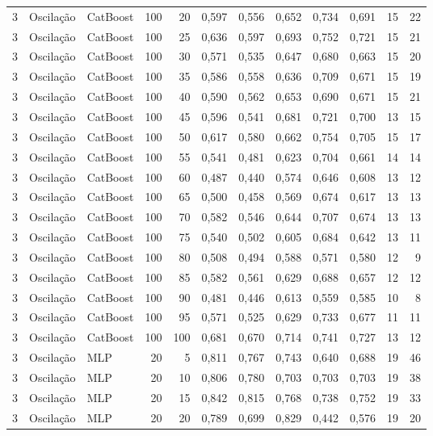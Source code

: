 \begin{longtable}{@{}rllrrrrrrrrr@{}}
3 & Oscilação & CatBoost & 100 & 20 & 0,597 & 0,556 & 0,652 & 0,734 & 0,691 & 15 & 22 \\
3 & Oscilação & CatBoost & 100 & 25 & 0,636 & 0,597 & 0,693 & 0,752 & 0,721 & 15 & 21 \\
3 & Oscilação & CatBoost & 100 & 30 & 0,571 & 0,535 & 0,647 & 0,680 & 0,663 & 15 & 20 \\
3 & Oscilação & CatBoost & 100 & 35 & 0,586 & 0,558 & 0,636 & 0,709 & 0,671 & 15 & 19 \\
3 & Oscilação & CatBoost & 100 & 40 & 0,590 & 0,562 & 0,653 & 0,690 & 0,671 & 15 & 21 \\
3 & Oscilação & CatBoost & 100 & 45 & 0,596 & 0,541 & 0,681 & 0,721 & 0,700 & 13 & 15 \\
3 & Oscilação & CatBoost & 100 & 50 & 0,617 & 0,580 & 0,662 & 0,754 & 0,705 & 15 & 17 \\
3 & Oscilação & CatBoost & 100 & 55 & 0,541 & 0,481 & 0,623 & 0,704 & 0,661 & 14 & 14 \\
3 & Oscilação & CatBoost & 100 & 60 & 0,487 & 0,440 & 0,574 & 0,646 & 0,608 & 13 & 12 \\
3 & Oscilação & CatBoost & 100 & 65 & 0,500 & 0,458 & 0,569 & 0,674 & 0,617 & 13 & 13 \\
3 & Oscilação & CatBoost & 100 & 70 & 0,582 & 0,546 & 0,644 & 0,707 & 0,674 & 13 & 13 \\
3 & Oscilação & CatBoost & 100 & 75 & 0,540 & 0,502 & 0,605 & 0,684 & 0,642 & 13 & 11 \\
3 & Oscilação & CatBoost & 100 & 80 & 0,508 & 0,494 & 0,588 & 0,571 & 0,580 & 12 & 9 \\
3 & Oscilação & CatBoost & 100 & 85 & 0,582 & 0,561 & 0,629 & 0,688 & 0,657 & 12 & 12 \\
3 & Oscilação & CatBoost & 100 & 90 & 0,481 & 0,446 & 0,613 & 0,559 & 0,585 & 10 & 8 \\
3 & Oscilação & CatBoost & 100 & 95 & 0,571 & 0,525 & 0,629 & 0,733 & 0,677 & 11 & 11 \\
3 & Oscilação & CatBoost & 100 & 100 & 0,681 & 0,670 & 0,714 & 0,741 & 0,727 & 13 & 12 \\
3 & Oscilação & MLP & 20 & 5 & 0,811 & 0,767 & 0,743 & 0,640 & 0,688 & 19 & 46 \\
3 & Oscilação & MLP & 20 & 10 & 0,806 & 0,780 & 0,703 & 0,703 & 0,703 & 19 & 38 \\
3 & Oscilação & MLP & 20 & 15 & 0,842 & 0,815 & 0,768 & 0,738 & 0,752 & 19 & 33 \\
3 & Oscilação & MLP & 20 & 20 & 0,789 & 0,699 & 0,829 & 0,442 & 0,576 & 19 & 20 \\

\end{longtable}
